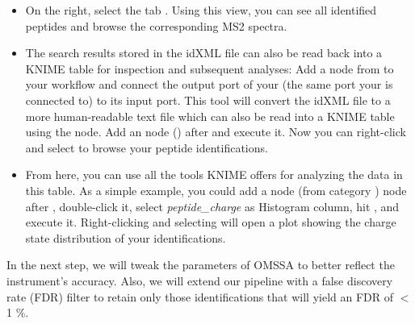 \begin{itemize}
\item On the right, select the tab . Using this view, you can see all identified peptides and browse the corresponding MS2 spectra.
\item The search results stored in the idXML file can also be read back into a KNIME table for inspection and subsequent analyses: Add a  node from  to your workflow and connect the output port of your  (the same port your  is connected to) to its input port. This tool will convert the idXML file to a more human-readable text file which can also be read into a KNIME table using the  node. Add an  node () after  and execute it. Now you can right-click  and select  to browse your peptide identifications.
\item From here, you can use all the tools KNIME offers for analyzing the data in this table. As a simple example, you could add a  node (from category ) node after , double-click it, select \textit{peptide\_charge} as Histogram column, hit , and execute it. Right-clicking and selecting  will open a plot showing the charge state distribution of your identifications.
\end{itemize}

In the next step, we will tweak the parameters of OMSSA to better reflect the instrument's accuracy. Also, we will extend our pipeline with a false discovery rate (FDR) filter to retain only those identifications that will yield an FDR of $<$ 1 \%.


